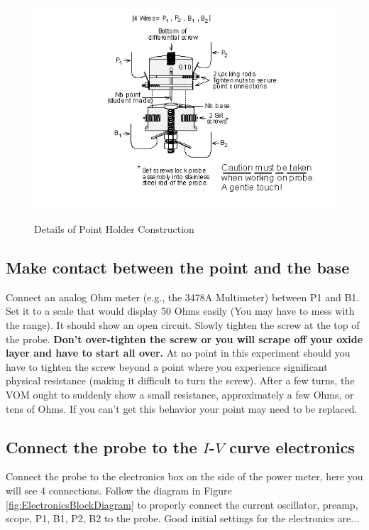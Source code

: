 \documentclass{../lab}
\begin{document}
\begin{figure}[h]
    \centering
    \href{http://experimentationlab.berkeley.edu/sites/default/files/images/JOS14.gif}{\includegraphics[width=0.85\linewidth]{images/JOS14.png}}
    \caption{Details of Point Holder Construction}
    \label{fig:DetailsOfPointHolderConstruction}
\end{figure}

\subsection{Make contact between the point and the base}

Connect an analog Ohm meter (e.g., the 3478A Multimeter) between P1 and B1. Set it to a scale that would display 50 Ohms easily (You may have to mess with the range). It should show an open circuit. Slowly tighten the screw at the top of the probe. \textbf{Don't over-tighten the screw or you will scrape off your oxide layer and have to start all over.} At no point in this experiment should you have to tighten the screw beyond a point where you experience significant physical resistance (making it difficult to turn the screw). After a few turns, the VOM ought to suddenly show a small resistance, approximately a few Ohms, or tens of Ohms. If you can't get this behavior your point may need to be replaced.

\subsection{Connect the probe to the \texorpdfstring{$I$-$V$}{I-V} curve electronics}

Connect the probe to the electronics box on the side of the power meter, here you will see 4 connections. Follow the diagram in Figure \ref{fig:ElectronicsBlockDiagram} to properly connect the current oscillator, preamp, scope, P1, B1, P2, B2 to the probe. Good initial settings for the electronics are...
\end{document}

